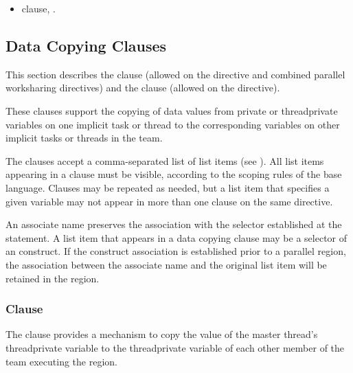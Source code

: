 \crossreferences
\begin{itemize}
\item {} clause,
.
\end{itemize}







\subsection{Data Copying Clauses}
\label{subsec:Data Copying Clauses}
This section describes the  clause (allowed on the  directive and
combined parallel worksharing directives) and the  clause (allowed on
the  directive).

These clauses support the copying of data values from private or threadprivate variables
on one implicit task or thread to the corresponding variables on other implicit tasks or
threads in the team.

The clauses accept a comma-separated list of list items (see ).
All list items appearing in a clause must be visible, according to the scoping rules of the
base language. Clauses may be repeated as needed, but a list item that specifies a given
variable may not appear in more than one clause on the same directive.

\begin{fortranspecific}
An associate name preserves the association with the selector established at the  statement. A list item that appears in a data copying clause may be a selector of an  construct. If the construct association is established prior to a parallel region, the association between the associate name and the original list item will be retained in the region.
\end{fortranspecific}







\subsubsection{ Clause}
\label{subsubsec:copyin clause}
\summary
The  clause provides a mechanism to copy the value of the master thread's
threadprivate variable to the threadprivate variable of each other member of the team
executing the  region.

